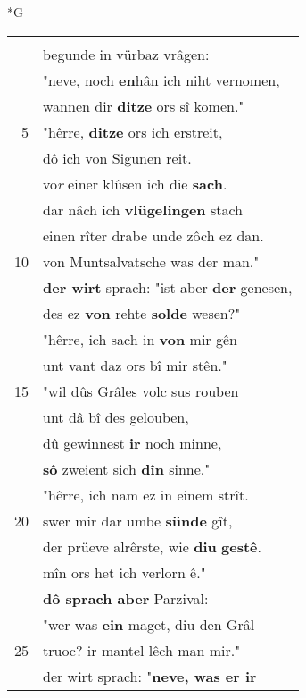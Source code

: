 \documentclass[8pt,a4paper,notitlepage]{article}
\begin{document}
\newpage
\begin{table}[ht]
\begin{minipage}[t]{0.5\linewidth}
\small
\begin{center}*G
\end{center}
\begin{tabular}{rl}
 & \textit{\begin{large}D\end{large}}er wirt ân allez bâgen\\ 
 & begunde in vürbaz vrâgen:\\ 
 & "neve, noch \textbf{en}hân ich niht vernomen,\\ 
 & wannen dir \textbf{ditze} ors sî komen."\\ 
5 & "hêrre, \textbf{ditze} ors ich erstreit,\\ 
 & dô ich von Sigunen reit.\\ 
 & vo\textit{r} einer klûsen ich die \textbf{sach}.\\ 
 & dar nâch ich \textbf{vlügelingen} stach\\ 
 & einen rîter drabe unde zôch ez dan.\\ 
10 & von Muntsalvatsche was der man."\\ 
 & \textbf{der wirt} sprach: "ist aber \textbf{der} genesen,\\ 
 & des ez \textbf{von} rehte \textbf{solde} wesen?"\\ 
 & "hêrre, ich sach in \textbf{von} mir gên\\ 
 & unt vant daz ors bî mir stên."\\ 
15 & "wil dûs Grâles volc sus rouben\\ 
 & unt dâ bî des gelouben,\\ 
 & dû gewinnest \textbf{ir} noch minne,\\ 
 & \textbf{sô} zweient sich \textbf{dîn} sinne."\\ 
 & "hêrre, ich nam ez in einem strît.\\ 
20 & swer mir dar umbe \textbf{sünde} gît,\\ 
 & der prüeve alrêrste, wie \textbf{diu} \textbf{gestê}.\\ 
 & mîn ors het ich verlorn ê."\\ 
 & \textbf{dô sprach aber} Parzival:\\ 
 & "wer was \textbf{ein} maget, diu den Grâl\\ 
25 & truoc? ir mantel lêch man mir."\\ 
 & der wirt sprach: "\textbf{neve, was er ir}\\ 

\end{tabular}
\end{minipage}
\end{table}
\end{document}
